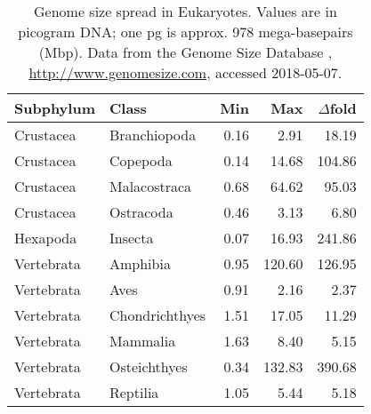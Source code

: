 \begin{table}[h]
\centering
\caption{Genome size spread in Eukaryotes. Values are in picogram DNA;
one pg is approx. 978 mega-basepairs (Mbp). Data from the Genome Size
Database \citep{Gregory2018}, \url{http://www.genomesize.com}, accessed
2018-05-07.}
\label{tab:genome-size-spread}
\begin{tabular}{@{}llrrr@{}}
\toprule
Subphylum  & Class              & Min  & Max    & $\Delta$fold  \\
\midrule
Crustacea  & Branchiopoda       & 0.16 &   2.91 &  18.19        \\
Crustacea  & Copepoda           & 0.14 &  14.68 & 104.86        \\
Crustacea  & Malacostraca       & 0.68 &  64.62 &  95.03        \\
Crustacea  & Ostracoda          & 0.46 &   3.13 &   6.80        \\
Hexapoda   & Insecta            & 0.07 &  16.93 & 241.86        \\
Vertebrata & Amphibia           & 0.95 & 120.60 & 126.95        \\
Vertebrata & Aves               & 0.91 &   2.16 &   2.37        \\
Vertebrata & Chondrichthyes     & 1.51 &  17.05 &  11.29        \\
Vertebrata & Mammalia           & 1.63 &   8.40 &   5.15        \\
Vertebrata & Osteichthyes       & 0.34 & 132.83 & 390.68        \\
Vertebrata & Reptilia           & 1.05 &   5.44 &   5.18        \\
\bottomrule
\end{tabular}
\end{table}


